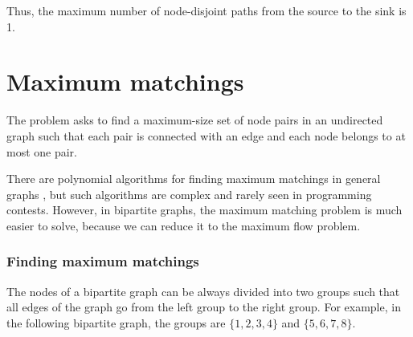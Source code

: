 Thus, the maximum number of node-disjoint paths
from the source to the sink is 1.

\section{Maximum matchings}


The  problem asks to find
a maximum-size set of node pairs in an undirected graph
such that each pair is connected with an edge and
each node belongs to at most one pair.

There are polynomial algorithms for finding
maximum matchings in general graphs \cite{edm65},
but such algorithms are complex and
rarely seen in programming contests.
However, in bipartite graphs,
the maximum matching problem is much easier
to solve, because we can reduce it to the
maximum flow problem.

\subsubsection{Finding maximum matchings}

The nodes of a bipartite graph can be always
divided into two groups such that all edges
of the graph go from the left group to the right group.
For example, in the following bipartite graph,
the groups are $\{1,2,3,4\}$ and $\{5,6,7,8\}$.

